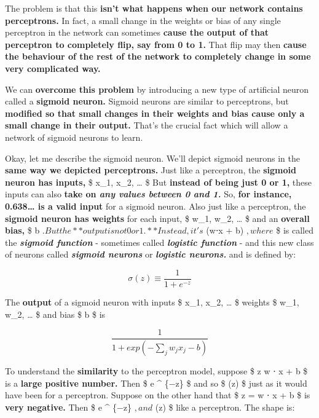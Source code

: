 \documentclass[]{article}
\begin{document}
The problem is that this \textbf{isn't what happens when our network
contains perceptrons.} In fact, a small change in the weights or bias of
any single perceptron in the network can sometimes \textbf{cause the
output of that perceptron to completely flip, say from 0 to 1.} That
flip may then \textbf{cause the behaviour of the rest of the network to
completely change in some very complicated way.}

We can \textbf{overcome this problem} by introducing a new type of
artificial neuron called a \textbf{sigmoid neuron.} Sigmoid neurons are
similar to perceptrons, but \textbf{modified so that small changes in
their weights and bias cause only a small change in their output.}
That's the crucial fact which will allow a network of sigmoid neurons to
learn.

Okay, let me describe the sigmoid neuron. We'll depict sigmoid neurons
in the \textbf{same way we depicted perceptrons.} Just like a
perceptron, the \textbf{sigmoid neuron has inputs,} \$ x\_1, x\_2,
\ldots{} \$ But \textbf{instead of being just 0 or 1,} these inputs can
also \textbf{take on \emph{any values between 0 and 1.}} So, \textbf{for
instance, 0.638\ldots{} is a valid input} for a sigmoid neuron. Also
just like a perceptron, the \textbf{sigmoid neuron has weights} for each
input, \$ w\_1, w\_2, \ldots{} \$ and an \textbf{overall bias,} \$ b
$. But the **output is not 0 or 1.** Instead, it's $ \sigma (w⋅x + b)
$, where $ \sigma \$ is called the \textbf{\emph{sigmoid function}} -
sometimes called \textbf{\emph{logistic function}} - and this new class
of neurons called \textbf{\emph{sigmoid neurons}} or
\textbf{\emph{logistic neurons.}} and is defined by:

\begin{equation}
    \sigma(z) \equiv \frac{1}{1 + e^{-z}}
\end{equation}

The \textbf{output} of a sigmoid neuron with inputs \$ x\_1, x\_2,
\ldots{} \$ weights \$ w\_1, w\_2, \ldots{} \$ and bias \$ b \$ is

\begin{equation}
    \frac {1}{1+exp(−\sum_j w_jx_j − b)}
\end{equation}

To understand the \textbf{similarity} to the perceptron model, suppose
\$ z \equiv w ⋅ x + b \$ is a \textbf{large positive number.} Then \$ e
\^{} \{−z\}  \$ and so \$ \sigma(z)  \$ just as it
would have been for a perceptron. Suppose on the other hand that \$ z =
w ⋅ x + b \$ is \textbf{very negative.} Then \$ e \^{} \{−z\}
\to \infty $, and $ \sigma(z)  \$ like a perceptron. The shape
is:
\end{document}
